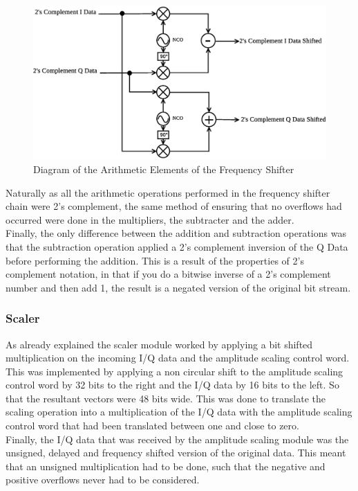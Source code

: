 		\begin{figure}[h!]
			\centering
			\includegraphics[width=0.8\linewidth]{img/Freq_Shift}
			\caption{Diagram of the Arithmetic Elements of the Frequency Shifter}
			\label{fig:freq_shift}
		\end{figure}
		
		\noindent Naturally as all the arithmetic operations performed in the frequency shifter chain were 2's complement, the same method of ensuring that no overflows had occurred were done in the multipliers, the subtracter and the adder. \\ \newline Finally, the only difference between the addition and subtraction operations was that the subtraction operation applied a 2's complement inversion of the Q Data before performing the addition. This is a result of the properties of 2's complement notation, in that if you do a bitwise inverse of a 2's complement number and then add 1, the result is a negated version of the original bit stream.\\
	
		\subsubsection{Scaler}
		As already explained the scaler module worked by applying a bit shifted multiplication on the incoming I/Q data and the amplitude scaling control word. This was implemented by applying a non circular shift to the amplitude scaling control word by 32 bits to the right and the I/Q data by 16 bits to the left. So that the resultant vectors were 48 bits wide. This was done to translate the scaling operation into a multiplication of the I/Q data with the amplitude scaling control word that had been translated between one and close to zero. \\ \newline Finally, the I/Q data that was received by the amplitude scaling module was the unsigned, delayed and frequency shifted version of the original data. This meant that an unsigned multiplication had to be done, such that the negative and positive overflows never had to be considered.
